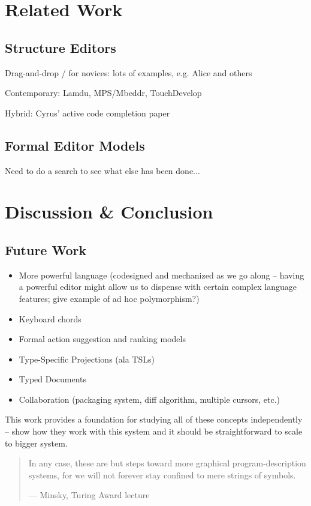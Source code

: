 \documentclass{llncs}
\begin{document}
\section{Related Work}
\subsection{Structure Editors}
Drag-and-drop / for novices: lots of examples, e.g. Alice and others

Contemporary: Lamdu, MPS/Mbeddr, TouchDevelop

Hybrid: Cyrus' active code completion paper


\subsection{Formal Editor Models}
Need to do a search to see what else has been done...

\section{Discussion \& Conclusion}
\subsection{Future Work}
\begin{itemize}
\item More powerful language (codesigned and mechanized as we go along -- having a powerful editor might allow us to dispense with certain complex language features; give example of ad hoc polymorphism?)
\item Keyboard chords
\item Formal action suggestion and ranking models
\item Type-Specific Projections (ala TSLs)
\item Typed Documents
\item Collaboration (packaging system, diff algorithm, multiple cursors, etc.)
\end{itemize}

This work provides a foundation for studying all of these concepts independently -- show how they work with this system and it should be straightforward to scale to bigger system.

\begin{quote}
In any case, these are but steps toward more graphical program-description systems, for we will not forever stay confined to mere strings of symbols.

--- Minsky, Turing Award lecture
\end{quote}

%
%


\end{document}
